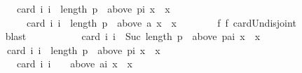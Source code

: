 \begin{isabellebody}
\ \ \ \ \ \ \ \ \ \ card\ {\isacharbraceleft}{\kern0pt}i{\isachardot}{\kern0pt}\ i\ {\isacharless}{\kern0pt}\ length\ p\ {\isasymand}\ {\isacharparenleft}{\kern0pt}above\ {\isacharparenleft}{\kern0pt}p{\isacharbang}{\kern0pt}i{\isacharparenright}{\kern0pt}\ x\ {\isacharequal}{\kern0pt}\ {\isacharbraceleft}{\kern0pt}x{\isacharbraceright}{\kern0pt}{\isacharparenright}{\kern0pt}{\isacharbraceright}{\kern0pt}\ {\isacharplus}{\kern0pt}\isanewline
\ \ \ \ \ \ \ \ \ \ \ \ card\ {\isacharbraceleft}{\kern0pt}i{\isachardot}{\kern0pt}\ i\ {\isacharequal}{\kern0pt}\ length\ p\ {\isasymand}\ {\isacharparenleft}{\kern0pt}above\ {\isacharparenleft}{\kern0pt}{\isacharbrackleft}{\kern0pt}a{\isacharbrackright}{\kern0pt}{\isacharbang}{\kern0pt}{}{\isacharparenright}{\kern0pt}\ x\ {\isacharequal}{\kern0pt}\ {\isacharbraceleft}{\kern0pt}x{\isacharbraceright}{\kern0pt}{\isacharparenright}{\kern0pt}{\isacharbraceright}{\kern0pt}{\isachardoublequoteclose}\isanewline
\ \ \ \ \ \ \isamarkupfalse%
\ f{}\ f{}\ card{\isacharunderscore}{\kern0pt}Un{\isacharunderscore}{\kern0pt}disjoint\isanewline
\ \ \ \ \ \ \isamarkupfalse%
\ blast\isanewline
\ \ \ \ \isamarkupfalse%
\isanewline
\ \ \ \ \ \ {\isachardoublequoteopen}card\ {\isacharbraceleft}{\kern0pt}i{\isachardot}{\kern0pt}\ i\ {\isacharless}{\kern0pt}\ Suc\ {\isacharparenleft}{\kern0pt}length\ p{\isacharparenright}{\kern0pt}\ {\isasymand}\ {\isacharparenleft}{\kern0pt}above\ {\isacharparenleft}{\kern0pt}{\isacharparenleft}{\kern0pt}p{\isacharat}{\kern0pt}{\isacharbrackleft}{\kern0pt}a{\isacharbrackright}{\kern0pt}{\isacharparenright}{\kern0pt}{\isacharbang}{\kern0pt}i{\isacharparenright}{\kern0pt}\ x\ {\isacharequal}{\kern0pt}\ {\isacharbraceleft}{\kern0pt}x{\isacharbraceright}{\kern0pt}{\isacharparenright}{\kern0pt}{\isacharbraceright}{\kern0pt}\ {\isacharequal}{\kern0pt}\isanewline
\ \ \ \ \ \ \ \ card\ {\isacharbraceleft}{\kern0pt}i{\isachardot}{\kern0pt}\ i\ {\isacharless}{\kern0pt}\ length\ p\ {\isasymand}\ {\isacharparenleft}{\kern0pt}above\ {\isacharparenleft}{\kern0pt}p{\isacharbang}{\kern0pt}i{\isacharparenright}{\kern0pt}\ x\ {\isacharequal}{\kern0pt}\ {\isacharbraceleft}{\kern0pt}x{\isacharbraceright}{\kern0pt}{\isacharparenright}{\kern0pt}{\isacharbraceright}{\kern0pt}\ {\isacharplus}{\kern0pt}\isanewline
\ \ \ \ \ \ \ \ \ \ card\ {\isacharbraceleft}{\kern0pt}i{\isachardot}{\kern0pt}\ i\ {\isacharequal}{\kern0pt}\ {}\ {\isasymand}\ {\isacharparenleft}{\kern0pt}above\ {\isacharparenleft}{\kern0pt}{\isacharbrackleft}{\kern0pt}a{\isacharbrackright}{\kern0pt}{\isacharbang}{\kern0pt}i{\isacharparenright}{\kern0pt}\ x\ {\isacharequal}{\kern0pt}\ {\isacharbraceleft}{\kern0pt}x{\isacharbraceright}{\kern0pt}{\isacharparenright}{\kern0pt}{\isacharbraceright}{\kern0pt}{\isachardoublequoteclose}\isanewline

\end{isabellebody}
